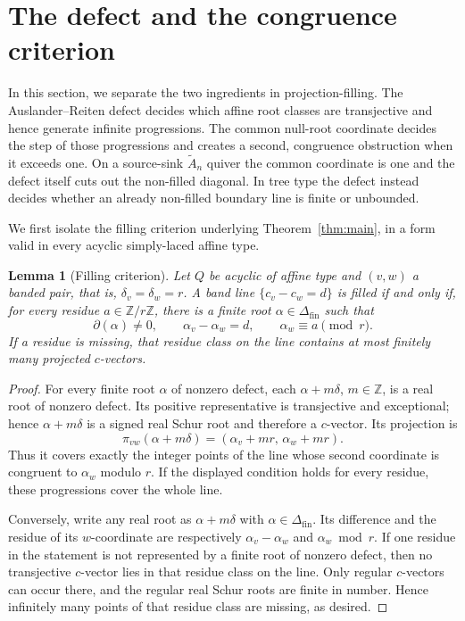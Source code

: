 \documentclass[11pt, a4paper]{amsart}
\newtheorem{lemma}[theorem]{Lemma}
\theoremstyle{definition}
\newcommand{\ZZ}{\mathbb{Z}}
\begin{document}
\section{The defect and the congruence criterion}
\label{sec:defect_meaning}

In this section, we separate the two ingredients in projection-filling.
The Auslander--Reiten defect decides which affine root classes are
transjective and hence generate infinite progressions. The common
null-root coordinate decides the step of those progressions and creates a
second, congruence obstruction when it exceeds one. On a source-sink
$\widetilde A_n$ quiver the common coordinate is one and the defect itself
cuts out the non-filled diagonal. In tree type the defect instead decides
whether an already non-filled boundary line is finite or unbounded.

We first isolate the filling criterion underlying
Theorem~\ref{thm:main}, in a form valid in every acyclic simply-laced affine type.

\begin{lemma}[Filling criterion]
\label{lem:filling_criterion}
Let $Q$ be acyclic of affine type and $(v, w)$ a banded pair, that is,
$\delta_v = \delta_w = r$. A band line $\{c_v - c_w = d\}$ is filled if
and only if, for every residue $a \in \ZZ/r\ZZ$, there is a finite root
$\alpha \in \Delta_{\mathrm{fin}}$ such that
\[
  \partial(\alpha) \neq 0, \qquad
  \alpha_v - \alpha_w = d, \qquad
  \alpha_w \equiv a \pmod r.
\]
If a residue is missing, that residue class on the line contains at most
finitely many projected $c$-vectors.
\end{lemma}

\begin{proof}
For every finite root $\alpha$ of nonzero defect, each
$\alpha + m\delta$, $m \in \ZZ$, is a real root of nonzero defect. Its
positive representative is transjective and exceptional; hence
$\alpha + m\delta$ is a signed real Schur root and therefore a $c$-vector.
Its projection is
\[
  \pi_{vw}(\alpha + m\delta)
  = (\alpha_v + mr,\, \alpha_w + mr).
\]
Thus it covers exactly the integer points of the line whose second
coordinate is congruent to $\alpha_w$ modulo $r$. If the displayed
condition holds for every residue, these progressions cover the whole line.

Conversely, write any real root as $\alpha + m\delta$ with
$\alpha \in \Delta_{\mathrm{fin}}$. Its difference and the residue of its
$w$-coordinate are respectively $\alpha_v-\alpha_w$ and
$\alpha_w \bmod r$. If one residue in the statement is not represented by
a finite root of nonzero defect, then no transjective $c$-vector lies in
that residue class on the line. Only regular $c$-vectors can occur there,
and the regular real Schur roots are finite in number. Hence infinitely many
points of that residue class are missing, as desired.
\end{proof}
\end{document}
